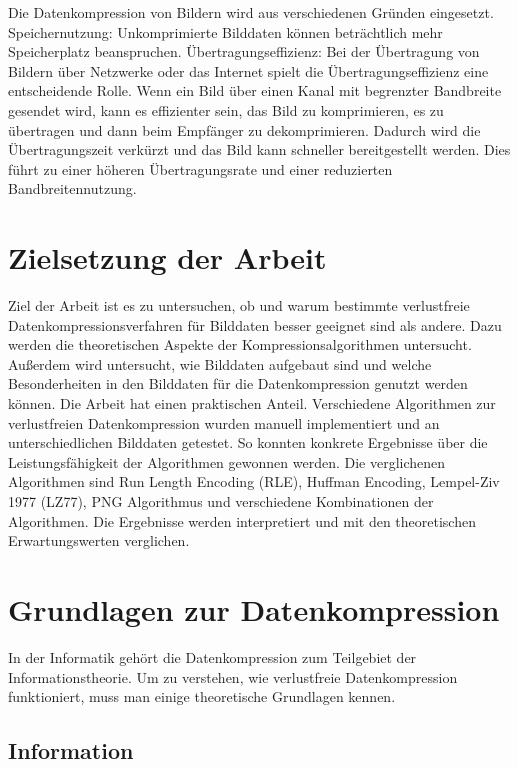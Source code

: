 \documentclass[conference]{IEEEtran}
\begin{document}
Die Datenkompression von Bildern wird aus verschiedenen Gründen eingesetzt.
Speichernutzung: Unkomprimierte Bilddaten können beträchtlich mehr Speicherplatz beanspruchen.
Übertragungseffizienz: Bei der Übertragung von Bildern über Netzwerke oder das Internet spielt
die Übertragungseffizienz eine entscheidende Rolle.
Wenn ein Bild über einen Kanal mit begrenzter Bandbreite gesendet wird, kann es effizienter
sein, das Bild zu komprimieren, es zu übertragen und dann beim Empfänger zu dekomprimieren.
Dadurch wird die Übertragungszeit verkürzt und das Bild kann schneller bereitgestellt werden.
Dies führt zu einer höheren Übertragungsrate und einer reduzierten Bandbreitennutzung.



\section{Zielsetzung der Arbeit}

Ziel der Arbeit ist es zu untersuchen, ob und warum bestimmte verlustfreie
Datenkompressionsverfahren für Bilddaten besser geeignet sind als andere.
Dazu werden die theoretischen Aspekte der Kompressionsalgorithmen untersucht.
Außerdem wird untersucht, wie Bilddaten aufgebaut sind und welche Besonderheiten
in den Bilddaten für die Datenkompression genutzt werden können.
Die Arbeit hat einen praktischen Anteil.
Verschiedene Algorithmen zur verlustfreien Datenkompression wurden manuell
implementiert und an unterschiedlichen Bilddaten getestet.
So konnten konkrete Ergebnisse über die Leistungsfähigkeit der Algorithmen gewonnen werden.
Die verglichenen Algorithmen sind Run Length Encoding (RLE), Huffman Encoding, 
Lempel-Ziv 1977 (LZ77), PNG Algorithmus und verschiedene Kombinationen der Algorithmen.
Die Ergebnisse werden interpretiert und mit den theoretischen Erwartungswerten verglichen.

\section{Grundlagen zur Datenkompression}

In der Informatik gehört die Datenkompression zum Teilgebiet der Informationstheorie.
Um zu verstehen, wie verlustfreie Datenkompression funktioniert, muss man einige theoretische
Grundlagen kennen.

\subsection{Information}
\end{document}
